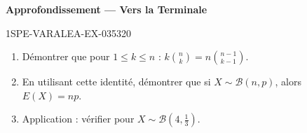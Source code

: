 \begin{center}\textbf{Approfondissement — Vers la Terminale}\end{center}
\begin{exercice}{1SPE-VARALEA-EX-035}{3}{20}
\begin{enumerate}
  \item Démontrer que pour $1 \leq k \leq n$ : $k \binom{n}{k} = n \binom{n-1}{k-1}$.
  \item En utilisant cette identité, démontrer que si $X \sim \mathcal{B}(n,p)$, alors $E(X) = np$.
  \item Application : vérifier pour $X \sim \mathcal{B}(4, \frac{1}{3})$.
\end{enumerate}
\end{exercice}
